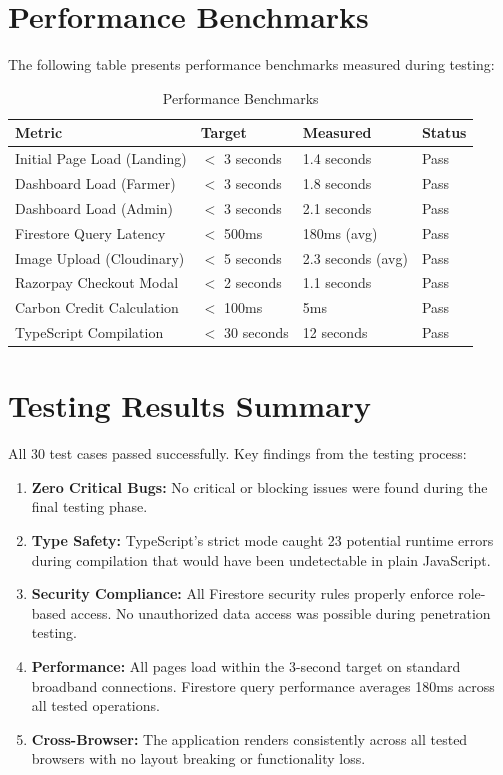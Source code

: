 \documentclass[a4paper,12pt,oneside]{report}
\let\originalitem\item
\renewcommand{\item}{\Needspace{10\baselineskip}\originalitem}
\begin{document}
\section{Performance Benchmarks}

\noindent The following table presents performance benchmarks measured during testing:

\begin{table}[h!]
\centering
\caption{Performance Benchmarks}
\label{tab:performance}
\begin{tabular}{|p{4.5cm}|p{3cm}|p{2.5cm}|p{2.5cm}|}
\hline
\textbf{Metric} & \textbf{Target} & \textbf{Measured} & \textbf{Status} \\
\hline
Initial Page Load (Landing) & $<$ 3 seconds & 1.4 seconds & Pass \\
\hline
Dashboard Load (Farmer) & $<$ 3 seconds & 1.8 seconds & Pass \\
\hline
Dashboard Load (Admin) & $<$ 3 seconds & 2.1 seconds & Pass \\
\hline
Firestore Query Latency & $<$ 500ms & 180ms (avg) & Pass \\
\hline
Image Upload (Cloudinary) & $<$ 5 seconds & 2.3 seconds (avg) & Pass \\
\hline
Razorpay Checkout Modal & $<$ 2 seconds & 1.1 seconds & Pass \\
\hline
Carbon Credit Calculation & $<$ 100ms & 5ms & Pass \\
\hline
TypeScript Compilation & $<$ 30 seconds & 12 seconds & Pass \\
\hline
\end{tabular}
\end{table}

\section{Testing Results Summary}

\noindent All 30 test cases passed successfully. Key findings from the testing process:

\begin{enumerate}
    \item \textbf{Zero Critical Bugs:} No critical or blocking issues were found during the final testing phase.
    \item \textbf{Type Safety:} TypeScript's strict mode caught 23 potential runtime errors during compilation that would have been undetectable in plain JavaScript.
    \item \textbf{Security Compliance:} All Firestore security rules properly enforce role-based access. No unauthorized data access was possible during penetration testing.
    \item \textbf{Performance:} All pages load within the 3-second target on standard broadband connections. Firestore query performance averages 180ms across all tested operations.
    \item \textbf{Cross-Browser:} The application renders consistently across all tested browsers with no layout breaking or functionality loss.
\end{enumerate}
\end{document}
